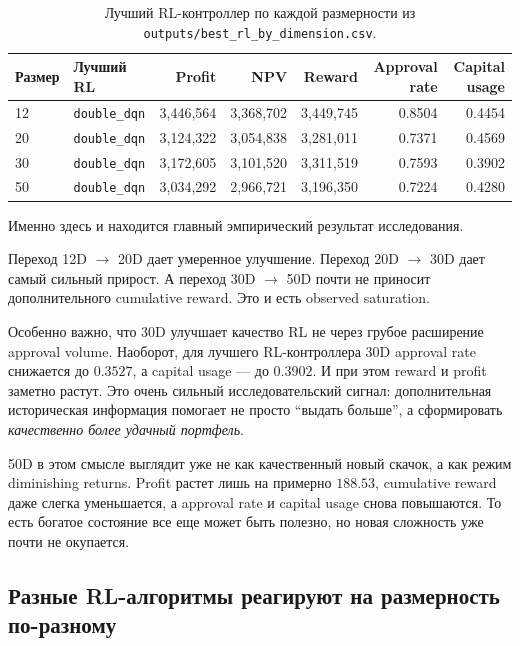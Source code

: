 \documentclass[12pt,a4paper]{article}
\begin{document}
\begin{table}[H]
    \centering
    \small
    \begin{tabular}{l l r r r r r}
        \toprule
        Размер & Лучший RL & Profit & NPV & Reward & Approval rate & Capital usage \\
        \midrule
        12 & \texttt{double\_dqn} & 3{,}446{,}564 & 3{,}368{,}702 & 3{,}449{,}745 & 0.8504 & 0.4454 \\
        20 & \texttt{double\_dqn} & 3{,}124{,}322 & 3{,}054{,}838 & 3{,}281{,}011 & 0.7371 & 0.4569 \\
        30 & \texttt{double\_dqn} & 3{,}172{,}605 & 3{,}101{,}520 & 3{,}311{,}519 & 0.7593 & 0.3902 \\
        50 & \texttt{double\_dqn} & 3{,}034{,}292 & 2{,}966{,}721 & 3{,}196{,}350 & 0.7224 & 0.4280 \\
        \bottomrule
    \end{tabular}
    \caption{Лучший RL-контроллер по каждой размерности из \texttt{outputs/best\_rl\_by\_dimension.csv}.}
    \label{tab:ru-best-rl}
\end{table}

Именно здесь и находится главный эмпирический результат исследования.

Переход 12D $\rightarrow$ 20D дает умеренное улучшение. Переход 20D $\rightarrow$ 30D дает самый сильный прирост. А переход 30D $\rightarrow$ 50D почти не приносит дополнительного cumulative reward. Это и есть observed saturation.

Особенно важно, что 30D улучшает качество RL не через грубое расширение approval volume. Наоборот, для лучшего RL-контроллера 30D approval rate снижается до $0.3527$, а capital usage --- до $0.3902$. И при этом reward и profit заметно растут. Это очень сильный исследовательский сигнал: дополнительная историческая информация помогает не просто ``выдать больше'', а сформировать \emph{качественно более удачный портфель}.

50D в этом смысле выглядит уже не как качественный новый скачок, а как режим diminishing returns. Profit растет лишь на примерно $188.53$, cumulative reward даже слегка уменьшается, а approval rate и capital usage снова повышаются. То есть богатое состояние все еще может быть полезно, но новая сложность уже почти не окупается.

\subsection{Разные RL-алгоритмы реагируют на размерность по-разному}
\end{document}
